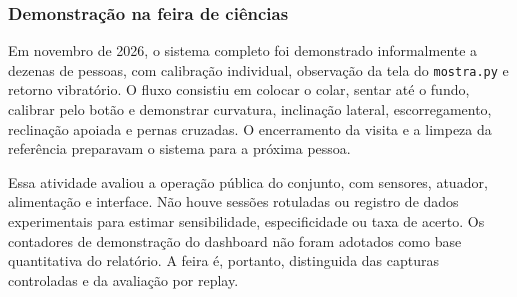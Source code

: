 \subsubsection{Demonstração na feira de ciências}

Em novembro de 2026, o sistema completo foi demonstrado informalmente
a dezenas de pessoas, com calibração individual, observação da tela
do \texttt{mostra.py} e retorno vibratório. O fluxo consistiu em
colocar o colar, sentar até o fundo, calibrar pelo botão e demonstrar
curvatura, inclinação lateral, escorregamento, reclinação apoiada e
pernas cruzadas. O encerramento da visita e a limpeza da referência
preparavam o sistema para a próxima pessoa.

Essa atividade avaliou a operação pública do conjunto, com sensores,
atuador, alimentação e interface. Não houve sessões rotuladas ou
registro de dados experimentais para estimar sensibilidade,
especificidade ou taxa de acerto. Os contadores de demonstração do
dashboard não foram adotados como base quantitativa do relatório.
A feira é, portanto, distinguida das capturas controladas e da
avaliação por replay.


